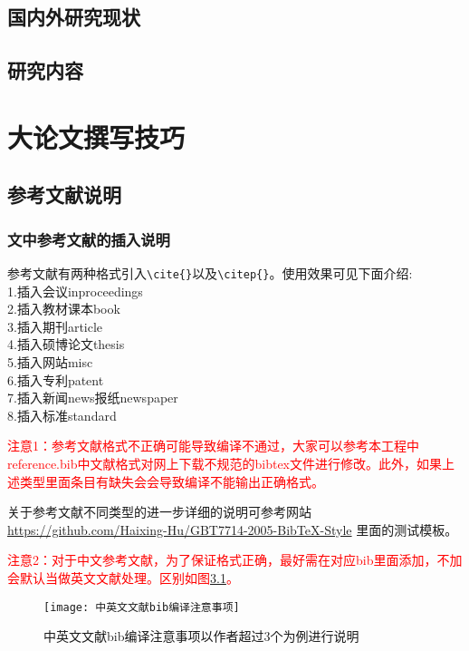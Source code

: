 \documentclass[master]{styles/hdu-thesis}
\begin{document}
\section{国内外研究现状}
\section{研究内容}



\chapter{大论文撰写技巧}


\section{参考文献说明}
\subsection{文中参考文献的插入说明}
参考文献有两种格式引入\verb+\cite{}+以及\verb+\citep{}+。使用效果可见下面介绍:\\
1.插入会议inproceedings\cite{zhao2015bearing0}\\
2.插入教材课本book\cite{williams1991probability,chengzhaolin2006,zhangsan2007}\\
3.插入期刊article\cite{cao2011formation,xue2015formation}\\
4.插入硕博论文thesis\cite{lisi2015,wangwu2015,deans2005bearings}\\
5.插入网站misc\cite{irdawebsite,h7n9,wikipedia_moores_law}\\
6.插入专利patent\cite{xiao2012yi,p6915001}\\
7.插入新闻news报纸newspaper\cite{zhang2000,renminribao}\\
8.插入标准standard\cite{gbt3469-1983}

\textcolor{red}{注意1：参考文献格式不正确可能导致编译不通过，大家可以参考本工程中reference.bib中文献格式对网上下载不规范的bibtex文件进行修改。此外，如果上述类型里面条目有缺失会会导致编译不能输出正确格式。}

关于参考文献不同类型的进一步详细的说明可参考网站\url{https://github.com/Haixing-Hu/GBT7714-2005-BibTeX-Style}
里面的测试模板。


\textcolor{red}{注意2：对于中文参考文献，为了保证格式正确，最好需在对应bib里面添加，不加会默认当做英文文献处理。区别如图\ref{fig_bib0}。}

\begin{figure}[!htb]
  \centering
  \texttt{[image: 中英文文献bib编译注意事项]}
  \caption{中英文文献bib编译注意事项以作者超过3个为例进行说明}
  \label{fig_bib0}
\end{figure}
\end{document}

